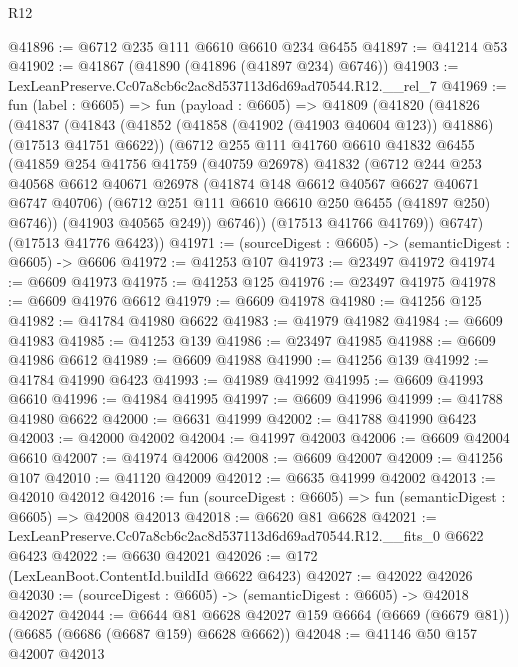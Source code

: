 \begin{lexlean}{R12}
\begin{coremodule}
@41896 := @6712 @235 @111 @6610 @6610 @234 @6455
@41897 := @41214 @53
@41902 := @41867 (@41890 (@41896 (@41897 @234) @6746))
@41903 := LexLeanPreserve.Cc07a8cb6c2ac8d537113d6d69ad70544.R12.__rel_7
@41969 := fun (label : @6605) =>
  fun (payload : @6605) =>
  @41809
    (@41820
      (@41826
        (@41837
          (@41843
            (@41852 (@41858 (@41902 (@41903 @40604 @123)) @41886) (@17513 @41751 @6622))
            (@6712
              @255
              @111
              @41760
              @6610
              @41832
              @6455
              (@41859
                @254
                @41756
                @41759
                (@40759 @26978)
                @41832
                (@6712
                  @244
                  @253
                  @40568
                  @6612
                  @40671
                  @26978
                  (@41874 @148 @6612 @40567 @6627 @40671 @6747 @40706)
                  (@6712 @251 @111 @6610 @6610 @250 @6455 (@41897 @250) @6746))
                (@41903 @40565 @249))
              @6746))
          (@17513 @41766 @41769))
        @6747)
      (@17513 @41776 @6423))
@41971 := (sourceDigest : @6605) -> (semanticDigest : @6605) -> @6606
@41972 := @41253 @107
@41973 := @23497 @41972
@41974 := @6609 @41973
@41975 := @41253 @125
@41976 := @23497 @41975
@41978 := @6609 @41976 @6612
@41979 := @6609 @41978
@41980 := @41256 @125
@41982 := @41784 @41980 @6622
@41983 := @41979 @41982
@41984 := @6609 @41983
@41985 := @41253 @139
@41986 := @23497 @41985
@41988 := @6609 @41986 @6612
@41989 := @6609 @41988
@41990 := @41256 @139
@41992 := @41784 @41990 @6423
@41993 := @41989 @41992
@41995 := @6609 @41993 @6610
@41996 := @41984 @41995
@41997 := @6609 @41996
@41999 := @41788 @41980 @6622
@42000 := @6631 @41999
@42002 := @41788 @41990 @6423
@42003 := @42000 @42002
@42004 := @41997 @42003
@42006 := @6609 @42004 @6610
@42007 := @41974 @42006
@42008 := @6609 @42007
@42009 := @41256 @107
@42010 := @41120 @42009
@42012 := @6635 @41999 @42002
@42013 := @42010 @42012
@42016 := fun (sourceDigest : @6605) => fun (semanticDigest : @6605) => @42008 @42013
@42018 := @6620 @81 @6628
@42021 := LexLeanPreserve.Cc07a8cb6c2ac8d537113d6d69ad70544.R12.__fits_0 @6622 @6423
@42022 := @6630 @42021
@42026 := @172 (LexLeanBoot.ContentId.buildId @6622 @6423)
@42027 := @42022 @42026
@42030 := (sourceDigest : @6605) -> (semanticDigest : @6605) -> @42018 @42027
@42044 := @6644
    @81
    @6628
    @42027
    @159
    @6664
    (@6669 (@6679 @81))
    (@6685 (@6686 (@6687 @159) @6628 @6662))
@42048 := @41146 @50 @157 @42007 @42013

\end{coremodule}
\end{lexlean}
